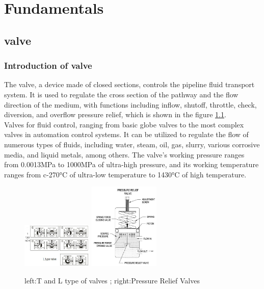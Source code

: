 \chapter{Fundamentals}
\label{ch:Fundamentals}


\section{valve}
\label{sec:valve}

\subsection{Introduction of valve}
\label{sec:IntroductionOfValve}

The valve, a device made of closed sections, controls the pipeline fluid transport system. 
It is used to regulate the cross section of the pathway and the flow direction of the medium, 
with functions including inflow, shutoff, throttle, check, diversion, and overflow pressure relief, 
which is shown in the figure \ref{fig:ValveType}.\\

Valves for fluid control, ranging from basic globe valves to the most complex valves in automation control systems.
It can be utilized to regulate the flow of numerous types of fluids, including water, steam, oil, gas, slurry, various corrosive media, and liquid metals, among others.
The valve's working pressure ranges from 0.0013MPa to 1000MPa of ultra-high pressure, 
and its working temperature ranges from c-270°C of ultra-low temperature to 1430°C of high temperature. \cite{Valvebaidu}

\begin{figure}[htbp]
    \centering
    \includegraphics[width=0.3\textwidth]{figures/Fundamentals/TLtype.jpg}
    \includegraphics[width=0.3\textwidth]{figures/Fundamentals/PRelief.jpg}
    \caption{left:T and L type of valves \cite{TLtype}; right:Pressure Relief Valves \cite{PRvalve} }
    \label{fig:ValveType}
\end{figure}

